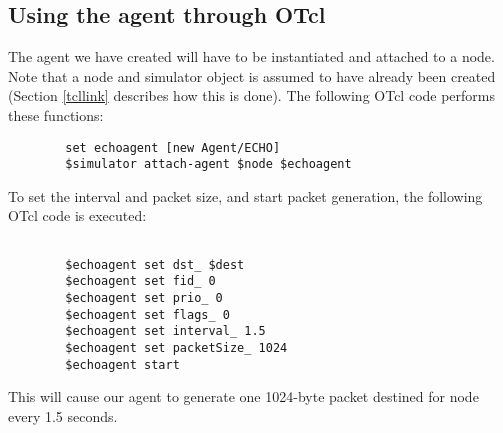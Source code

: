 \subsection{Using the agent through OTcl}

The agent we have created will have to be instantiated and attached
to a node.
Note that a node and simulator object is assumed to have
already been
created (Section \ref{tcllink} describes how this is done).
The following OTcl code performs these functions:
\begin{small}
\begin{verbatim}
        set echoagent [new Agent/ECHO]
        $simulator attach-agent $node $echoagent
\end{verbatim}
\end{small}

To set the interval and packet size, and start packet generation,
the following OTcl code is executed:
\begin{small}
\begin{verbatim}

        $echoagent set dst_ $dest
        $echoagent set fid_ 0
        $echoagent set prio_ 0
        $echoagent set flags_ 0
        $echoagent set interval_ 1.5
        $echoagent set packetSize_ 1024
        $echoagent start
\end{verbatim}
\end{small}

This will cause our agent to generate one 1024-byte packet destined for
node  every 1.5 seconds.
